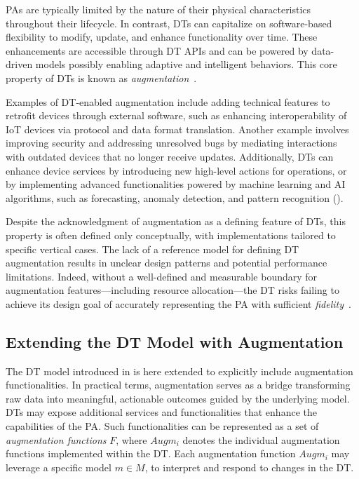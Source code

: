 \acp{PA} are typically limited by the nature of their physical characteristics throughout their lifecycle. In contrast, \acp{DT} can capitalize on software-based flexibility to modify, update, and enhance functionality over time.
These enhancements are accessible through \ac{DT} \acp{API} and can be powered by data-driven models possibly enabling adaptive and intelligent behaviors.
This core property of \acp{DT} is known as \emph{augmentation}~\cite{dt-IoT-context-Minerva-2020}.

Examples of DT-enabled augmentation include adding technical features to retrofit devices through external software, such as enhancing interoperability of \ac{IoT} devices via protocol and data format translation. Another example involves improving security and addressing unresolved bugs by mediating interactions with outdated devices that no longer receive updates. Additionally, \acp{DT} can enhance device services by introducing new high-level actions for operations, or by implementing advanced functionalities powered by machine learning and \ac{AI} algorithms, such as forecasting, anomaly detection, and pattern recognition ().

Despite the acknowledgment of augmentation as a defining feature of \acp{DT},
this property is often defined only conceptually, with implementations tailored to specific vertical cases.
The lack of a reference model for defining \ac{DT} augmentation results in unclear design patterns and potential performance limitations.
Indeed, without a well-defined and measurable boundary for augmentation features---including resource allocation---the \ac{DT} risks failing to achieve its design goal of accurately representing the \ac{PA} with sufficient \emph{fidelity}~\cite{Bellavista_Bicocchi_Fogli_Giannelli_Mamei_Picone_2023}.

\subsection{Extending the DT Model with Augmentation}

The \ac{DT} model introduced in  is here extended to explicitly include augmentation functionalities.
%
In practical terms, augmentation serves as a bridge transforming raw data into meaningful, actionable outcomes guided by the underlying model.
\acp{DT} may expose additional services and functionalities that enhance the capabilities of the \ac{PA}.
Such functionalities can be represented as a set of \emph{augmentation functions} $F$, where $Augm_{i}$ denotes the individual augmentation functions implemented within the DT. Each augmentation function $Augm_i$ may leverage a specific model $m \in M$, to interpret and respond to changes in the DT.

